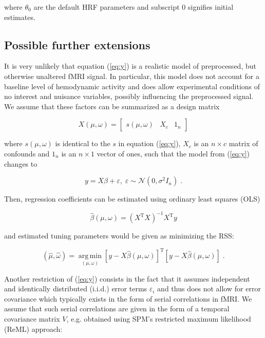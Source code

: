\documentclass[a4paper,12pt]{article}
\begin{document}
where $\theta_0$ are the default HRF parameters and subscript 0 signifies initial estimates.


\subsection{Possible further extensions}

It is very unlikely that equation (\ref{eq:y}) is a realistic model of preprocessed, but otherwise unaltered fMRI signal. In particular, this model does not account for a baseline level of hemodynamic activity and does allow experimental conditions of no interest and nuisance variables, possibly influencing the preprocessed signal. We assume that these factors can be summarized as a design matrix

\begin{equation} \label{eq:X}
X(\mu,\omega) = \left[ \begin{matrix} s(\mu,\omega) & X_c & 1_n \end{matrix} \right]
\end{equation}

where $s(\mu,\omega)$ is identical to the $s$ in equation (\ref{eq:y}), $X_c$ is an $n \times c$ matrix of confounds and $1_n$ is an $n \times 1$ vector of ones, such that the model from (\ref{eq:y}) changes to

\begin{equation} \label{eq:y-X}
y = X \beta + \varepsilon, \; \varepsilon \sim \mathcal{N}(0, \sigma^2 I_n) \; .
\end{equation}

Then, regression coefficients can be estimated using ordinary least squares (OLS)

\begin{equation} \label{eq:b-est-X}
\hat{\beta}(\mu,\omega) = (X^\mathrm{T} X)^{-1} X^\mathrm{T} y
\end{equation}

and estimated tuning parameters would be given as minimizing the RSS:

\begin{equation} \label{eq:mu-tw-est-X}
(\hat{\mu},\hat{\omega}) = \operatorname*{arg\,min}_{(\mu,\omega)} \left[ y - X \hat{\beta}(\mu,\omega) \right]^\mathrm{T} \left[ y - X \hat{\beta}(\mu,\omega) \right] \; .
\end{equation}

Another restriction of (\ref{eq:y}) consists in the fact that it assumes independent and identically distributed (i.i.d.) error terms $\varepsilon_i$ and thus does not allow for error covariance which typically exists in the form of serial correlations in fMRI. We assume that such serial correlations are given in the form of a temporal covariance matrix $V$, e.g. obtained using SPM's restricted maximum likelihood (ReML) approach:
\end{document}
